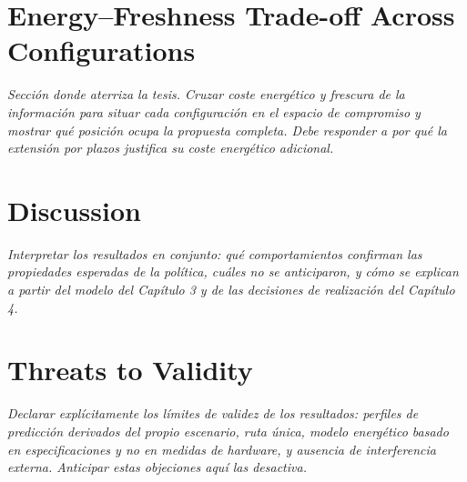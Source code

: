 \section{Energy--Freshness Trade-off Across Configurations}
\emph{Sección donde aterriza la tesis. Cruzar coste energético y frescura de la
información para situar cada configuración en el espacio de compromiso y mostrar
qué posición ocupa la propuesta completa. Debe responder a por qué la extensión
por plazos justifica su coste energético adicional.}

\section{Discussion}
\emph{Interpretar los resultados en conjunto: qué comportamientos confirman las
propiedades esperadas de la política, cuáles no se anticiparon, y cómo se
explican a partir del modelo del Capítulo 3 y de las decisiones de realización
del Capítulo 4.}

\section{Threats to Validity}
\emph{Declarar explícitamente los límites de validez de los resultados: perfiles
de predicción derivados del propio escenario, ruta única, modelo energético
basado en especificaciones y no en medidas de hardware, y ausencia de
interferencia externa. Anticipar estas objeciones aquí las desactiva.}
